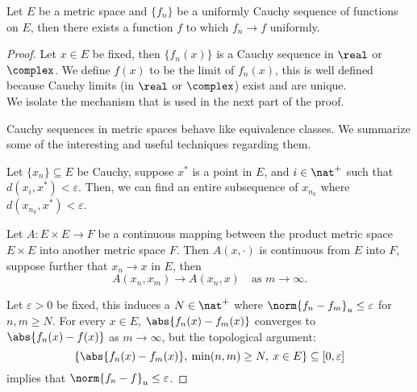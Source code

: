 \documentclass[../../main.tex]{subfiles}
\begin{document}
\begin{wts}[Rudin 7.8]
    Let $E$ be a metric space and $\{f_n\}$ be a uniformly Cauchy sequence of functions on $E$, then there exists a function $f$ to which $f_n\to f$ uniformly.
\end{wts}
\begin{proof}
    Let $x\in E$ be fixed, then $\{f_n(x)\}$ is a Cauchy sequence in $\real$ or $\complex$. We define $f(x)$ to be the limit of $f_n(x)$, this is well defined because Cauchy limits (in $\real$ or $\complex$) exist and are unique.\\

    We isolate the mechanism that is used in the next part of the proof.
    \begin{note}
        Cauchy sequences in metric spaces behave like equivalence classes. We summarize some of the interesting and useful techniques regarding them.

        \begin{lemma}\label{lem:dragging-friends-along}
        Let $\{x_n\}\subseteq E$ be Cauchy, suppose $x^*$ is a point in $E$, and $i\in \nat^+$ such that $d(x_i, x^*)<\varepsilon$. Then, we can find an entire subsequence of $x_{n_k}$ where $d(x_{n_k},x^*)<\varepsilon$.     
        \end{lemma}
        \begin{lemma}\label{lem:replace limit continuity edition}
            Let $A: E\times E\to F$ be a continuous mapping between the product metric space $E\times E$ into another metric space $F$. Then $A(x,\cdot)$ is continuous from $E$ into $F$, suppose further that $x_n\to x$ in $E$, then
            \[
                A(x_n, x_m)\to A(x_n, x)\quad\text{as }m\to\infty.
            \]
        \end{lemma}
    \end{note}
    Let $\varepsilon>0$ be fixed, this induces a $N\in\nat^+$ where $\norm{f_n - f_m}_{u}\leq \varepsilon$ for $n,m\geq N$. For every $x\in E$, $\abs{f_n(x) - f_m(x)}$ converges to $\abs{f_n(x) - f(x)}$ as $m\to\infty$, but the topological argument: 
    \[\{\abs{f_n(x) - f_m(x)},\: \min(n,m)\geq N,\: x\in E\}\subseteq [0,\varepsilon]\]
    implies that $\norm{f_n - f}_u\leq \varepsilon$.
    
\end{proof}
\end{document}
